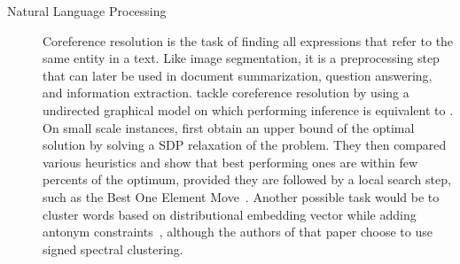 \begin{description}
   \item[Natural Language Processing] 
      Coreference resolution is the task of finding all expressions that refer to the same entity in
      a text. Like image segmentation, it is a preprocessing step that can later be used in document
      summarization, question answering, and information extraction. \Textcite[Section
      2.3]{graphicalCoreference04} tackle coreference resolution by using a undirected graphical
      model on which performing inference is equivalent to \pcc{}. On small scale instances,
      \textcite{Elsner2009} first obtain an upper bound of the optimal solution by solving a SDP
      relaxation of the problem. They then compared various heuristics and show that best performing
      ones are within few percents of the optimum, provided they are followed by a local search
      step, such as the Best One Element Move~\autocite{Gionis2007}. Another possible task would be
      to cluster words based on distributional embedding vector while adding antonym
      constraints~\autocite{SignedWordRatings}, although the authors of that paper choose to use
      signed spectral clustering.


\end{description}
